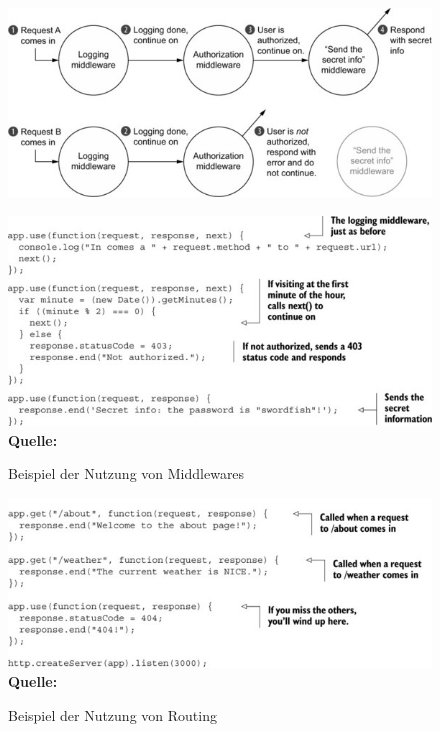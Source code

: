 \documentclass[a4paper,12pt]{report}
\begin{document}
  \begin{figure}[ht]
\raggedleft
  \includegraphics[width=160mm]{Middleware-Beispiel.jpg}
  
  \vspace{20mm}
  
  \includegraphics[width=160mm]{Middleware-Beispiel-2.jpg}
    \footnotesize\sffamily\textbf{Quelle:} \cite{expressbook}
  \caption{Beispiel der Nutzung von Middlewares}
  \label{fig:middleware-beispiel}
\end{figure}

  \begin{figure}[ht]
  \centering
  \includegraphics[width=160mm]{express-routing-example.jpg}
\raggedleft
    \footnotesize\sffamily\textbf{Quelle:} \cite{expressbook}
  \caption{Beispiel der Nutzung von Routing}
  \label{fig:routing-beispiel}
\end{figure}
\end{document}
